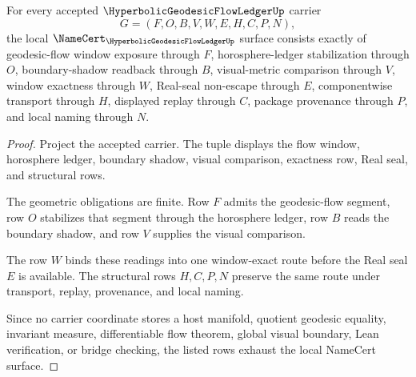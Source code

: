 \begin{theorem}
\label{thm:hyperbolic-geodesic-flow-ledger-namecert-obligations}
For every accepted $\HyperbolicGeodesicFlowLedgerUp$ carrier
$$
G=(F,O,B,V,W,E,H,C,P,N),
$$
the local $\NameCert_{\HyperbolicGeodesicFlowLedgerUp}$ surface consists exactly of geodesic-flow window exposure through $F$, horosphere-ledger stabilization through $O$, boundary-shadow readback through $B$, visual-metric comparison through $V$, window exactness through $W$, Real-seal non-escape through $E$, componentwise transport through $H$, displayed replay through $C$, package provenance through $P$, and local naming through $N$.
\end{theorem}
\begin{proof}
Project the accepted carrier. The tuple displays the flow window, horosphere ledger, boundary shadow, visual comparison, exactness row, Real seal, and structural rows.

The geometric obligations are finite. Row $F$ admits the geodesic-flow segment, row $O$ stabilizes that segment through the horosphere ledger, row $B$ reads the boundary shadow, and row $V$ supplies the visual comparison.

The row $W$ binds these readings into one window-exact route before the Real seal $E$ is available. The structural rows $H,C,P,N$ preserve the same route under transport, replay, provenance, and local naming.

Since no carrier coordinate stores a host manifold, quotient geodesic equality, invariant measure, differentiable flow theorem, global visual boundary, Lean verification, or bridge checking, the listed rows exhaust the local NameCert surface.
\end{proof}

